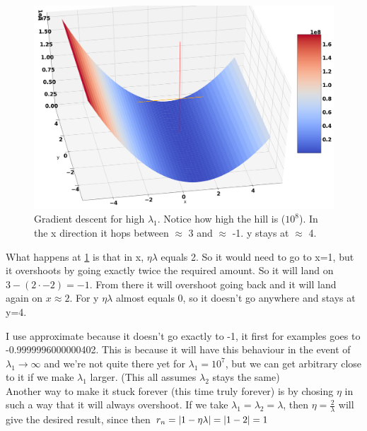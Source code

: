 \documentclass[a4paper]{article}
\begin{document}
\begin{figure}[H]
\includegraphics[width=\textwidth]{Images/HighLamb.png}
\caption{Gradient descent for high $\lambda_1$. Notice how high the hill is ($10^8$). In the x direction it hops between $\approx$ 3 and $\approx$ -1. y stays at $\approx$ 4.}
\label{mountain}
\end{figure}

What happens at \ref{mountain} is that in x, $\eta \lambda$ equals 2. So it would need to go to x=1, but it overshoots by going exactly twice the required amount. So it will land on $3 - (2\cdot -2) = -1$.
From there it will overshoot going back and it will land again on $x\approx 2$. For y $\eta \lambda$ almost equals 0, so it doesn't go anywhere and stays at y=4.

I use approximate because it doesn't go exactly to -1, it first for examples goes to -0.9999996000000402. This is because it will have this behaviour in the event of $\lambda_1 \rightarrow \infty$ and we're not quite there yet for $\lambda_1 = 10^7$, but we can get arbitrary close to it if we make $\lambda_1$ larger. (This all assumes $\lambda_2$ stays the same)
\\

Another way to make it stuck forever (this time truly forever) is by chosing $\eta$ in such a way that it will always overshoot. If we take $\lambda_1 = \lambda_2 = \lambda$, then $\eta = \frac{2}{\lambda}$ will give the desired result, since then $r_n = \abs{1-\eta \lambda} = \abs{1 - 2} = 1$
\end{document}
